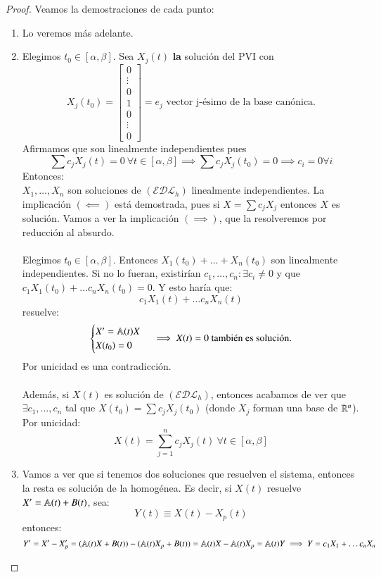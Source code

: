 \begin{proof}
    Veamos la demostraciones de cada punto:\\
    \begin{enumerate}
        \item Lo veremos más adelante.
        \item Elegimos $t_0 \in [\alpha, \beta]$. Sea $X_j(t)$ \textbf{la} solución del PVI con
        $$
            X_j(t_0) = \left[\begin{matrix}
                0\\
                \vdots\\
                0\\
                1\\
                0\\
                \vdots\\
                0
        \end{matrix}\right] = e_j \text{ vector j-ésimo de la base canónica.}
        $$
        Afirmamos que son linealmente independientes pues
        $$
            \sum c_j X_j(t) = 0\ \forall t \in [\alpha, \beta] \implies \sum c_jX_j(t_0) = 0 \implies c_i = 0 \forall i
        $$
        Entonces:\\
        $X_1, \ldots, X_n$ son soluciones de $(\mathcal{EDL}_h)$ linealmente independientes. La implicación $(\impliedby)$ está demostrada, pues si $X = \sum c_j X_j$ entonces $X$ es solución. Vamos a ver la implicación $(\implies)$, que la resolveremos por reducción al absurdo.\\\\
        Elegimos $t_0 \in [\alpha, \beta]$. Entonces $X_1(t_0) + \ldots + X_n(t_0)$ son linealmente independientes. Si no lo fueran, existirían $c_1, \ldots, c_n : \exists c_i \neq 0$ y que $c_1X_1(t_0) + \ldots c_n X_n(t_0) = 0$. Y esto haría que:
        $$
            c_1X_1(t) + \ldots c_nX_n(t)
        $$ resuelve:
        $$
        \begin{cases}
            X' = \mathbb{A}(t)X\\
            X(t_0) = 0
        \end{cases} \implies X(t) = 0 \text{ también es solución.}
        $$
        Por unicidad es una contradicción.\\\\
        Además, si $X(t)$ es solución de $(\mathcal{EDL}_h)$, entonces acabamos de ver que $\exists c_1, \ldots, c_n$ tal que $X(t_0) = \sum c_jX_j(t_0)$ (donde $X_j$ forman una base de $\mathbb{R}^n$). Por unicidad:
        $$
            X(t) = \sum_{j=1}^n c_jX_j(t)\ \forall t\in[\alpha, \beta]
        $$
        \item Vamos a ver que si tenemos dos soluciones que resuelven el sistema, entonces la resta es solución de la homogénea. Es decir, si $X(t)$ resuelve $X' = \mathbb{A}(t) + B(t)$, sea:
        $$
            Y(t) \equiv X(t) - X_p(t)
        $$
        entonces:
        $$
            Y' = X' - X_p' = (\mathbb{A}(t)X + B(t)) - (\mathbb{A}(t)X_p + B(t)) = \mathbb{A}(t)X - \mathbb{A}(t)X_p = \mathbb{A}(t)Y \implies
            Y = c_1X_1 + \ldots c_nX_n
        $$
    \end{enumerate}
\end{proof}
